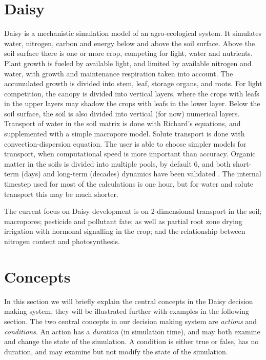 \documentclass[a4paper]{article}
\begin{document}
\section{Daisy}

Daisy \cite{daisy-fertilizer,daisy-ems} is a mechanistic simulation
model of an agro-ecological system.  It simulates water, nitrogen,
carbon and energy below and above the soil surface.  Above the soil
surface there is one or more crop, competing for light, water and
nutrients.  Plant growth is fueled by available light, and limited by
available nitrogen and water, with growth and maintenance respiration
taken into account.  The accumulated growth is divided into stem,
leaf, storage organs, and roots.  For light competition, the canopy is
divided into vertical layers, where the crops with leafs in the upper
layers may shadow the crops with leafs in the lower layer.  Below the
soil surface, the soil is also divided into vertical (for now)
numerical layers.  Transport of water in the soil matrix is done with
Richard's equations, and supplemented with a simple macropore model.
Solute transport is done with convection-dispersion equation.  The
user is able to choose simpler models for transport, when
computational speed is more important than accuracy.  Organic matter
in the soils is divided into multiple pools, by default 6, and both
short-term (days) and long-term (decades) dynamics have been validated
\cite{willigen91-compar,vereecken91-compar,diekkruger95-compar,smith97-compar,daisy-somnew}.
The internal timestep used for most of the calculations is one hour,
but for water and solute transport this may be much shorter.

The current focus on Daisy development is on 2-dimensional transport
in the soil; macropores; pesticide and pollutant fate; as well as
partial root zone drying irrigation with hormonal signalling in the
crop; and the relationship between nitrogen content and
photosynthesis.

\section{Concepts}

In this section we will briefly explain the central concepts in the
Daisy decision making system, they will be illustrated further with
examples in the following section.  The two central concepts in our
decision making system are \emph{actions} and \emph{conditions}.  An
action has a \emph{duration} (in simulation time), and may both
examine and change the state of the simulation.  A condition is either
true or false, has no duration, and may examine but not modify the
state of the simulation.
\end{document}
